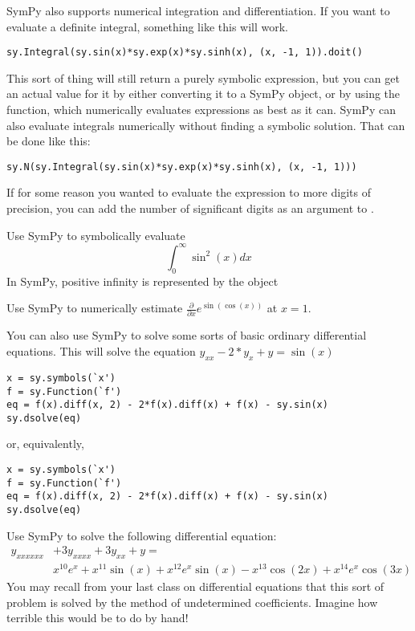 SymPy also supports numerical integration and differentiation. 
If you want to evaluate a definite integral, something like this will work.
\begin{lstlisting}
sy.Integral(sy.sin(x)*sy.exp(x)*sy.sinh(x), (x, -1, 1)).doit()
\end{lstlisting}
This sort of thing will still return a purely symbolic expression, but you can get an actual value for it by either converting it to a SymPy  object, or by using the  function, which numerically evaluates expressions as best as it can.
SymPy can also evaluate integrals numerically without finding a symbolic solution. That can be done like this:
\begin{lstlisting}
sy.N(sy.Integral(sy.sin(x)*sy.exp(x)*sy.sinh(x), (x, -1, 1)))
\end{lstlisting}
If for some reason you wanted to evaluate the expression to more digits of precision, you can add the number of significant digits as an argument to .

\begin{problem}
Use SymPy to symbolically evaluate 
\begin{equation*}
\int_0^\infty \sin^2 \left(x\right) dx
\end{equation*}
In SymPy, positive infinity is represented by the object 
\end{problem}

\begin{problem}
Use SymPy to numerically estimate $\frac{\partial}{\partial x}e^{\sin\left(\cos\left(x\right)\right)}$ at $x=1$.
\end{problem}

You can also use SymPy to solve some sorts of basic ordinary differential equations.
This will solve the equation $y_{xx}-2*y_x+y=\sin\left(x\right)$
\begin{lstlisting}
x = sy.symbols(`x')
f = sy.Function(`f')
eq = f(x).diff(x, 2) - 2*f(x).diff(x) + f(x) - sy.sin(x)
sy.dsolve(eq)
\end{lstlisting}
or, equivalently,
\begin{lstlisting}
x = sy.symbols(`x')
f = sy.Function(`f')
eq = f(x).diff(x, 2) - 2*f(x).diff(x) + f(x) - sy.sin(x)
sy.dsolve(eq)
\end{lstlisting}
\begin{problem}
Use SymPy to solve the following differential equation:
\begin{equation*}
\begin{split}
 y_{xxxxxx} & + 3y_{xxxx} + 3y_{xx} + y = \\
& x^{10}e^x + x^{11}\sin\left(x\right) + x^{12}e^x\sin\left(x\right) -x^{13}\cos\left(2x\right) + x^{14}e^x\cos\left(3x\right)
\end{split}
\end{equation*}
You may recall from your last class on differential equations that this sort of problem is solved by the method of undetermined coefficients. 
Imagine how terrible this would be to do by hand!
\end{problem}

